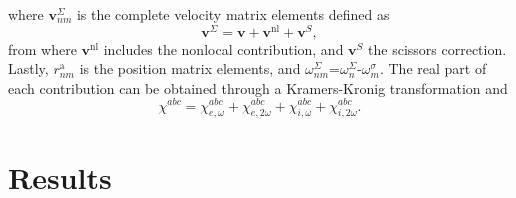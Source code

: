 \documentclass[pss]{wiley2sp} %
\begin{document}
where $\mathbf{v}^{\Sigma}_{nm}$ is the complete velocity matrix elements defined as
\begin{equation}\label{eq:nonlocal}
\mathbf{v}^{\Sigma}=\mathbf{v}+\mathbf{v}^{\mathrm{nl}}+\mathbf{v}^{S},
\end{equation}
from where $\mathbf{v}^{\mathrm{nl}}$ includes the nonlocal contribution, and $\mathbf{v}^{S}$ the scissors correction. Lastly, $r^{\mathrm{a}}_{nm}$ is the position matrix elements, and $\omega^\Sigma_{nm}$=$\omega^{\Sigma}_{n}$-$\omega^{\sigma}_{m}$. The real part of each contribution can be obtained through a Kramers-Kronig transformation \cite{tancognePRB14} and
\begin{equation*}\label{eq:chitotal}
    \chi^{abc} = \chi^{abc}_{e,\omega} + \chi^{abc}_{e,2\omega} +
    \chi^{abc}_{i,\omega} + \chi^{abc}_{i,2\omega}
    .
\end{equation*}

\section{Results}\label{sec:results}
\end{document}
